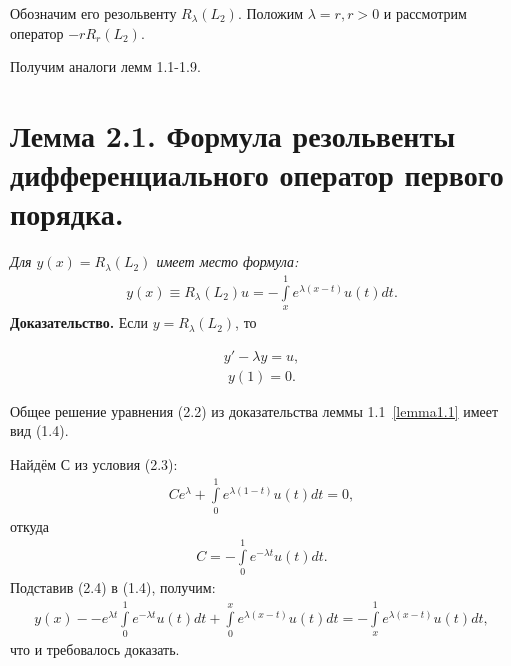 Обозначим его резольвенту $R_\lambda(L_2)$. Положим $ \lambda = r, r > 0 $ и рассмотрим оператор $ -rR_r(L_2) $.

Получим аналоги лемм 1.1-1.9.

\section{Лемма 2.1. Формула резольвенты дифференциального оператор первого порядка.}
\label{lemma2.1} 
\textit{Для $ y(x) = R_\lambda(L_2) $ имеет место формула:}
\begin{equation}
\begin{array}{c}

y(x) \equiv R_\lambda(L_2)u = -\int\limits_x^1 e^{\lambda (x-t)}u(t)dt.

\end{array}
\end{equation}
\textbf{Доказательство.} Если $ y = R_\lambda(L_2) $, то

\begin{equation}
\begin{array}{c}

y' - \lambda y = u,

\end{array}
\end{equation}
\begin{equation}
\begin{array}{c}

y(1) = 0.

\end{array}
\end{equation}

Общее решение уравнения (2.2) из доказательства леммы 1.1~\eqref{lemma1.1} имеет вид (1.4).

Найдём $ С $ из условия (2.3):
\begin{equation}
\begin{array}{c}
\nonumber

Ce^\lambda + \int\limits_0^1 e^{\lambda (1-t)}u(t)dt = 0,

\end{array}
\end{equation}
откуда
\begin{equation}
\begin{array}{c}

C = - \int\limits_0^1 e^{-\lambda t}u(t)dt.

\end{array}
\end{equation}
Подставив (2.4) в (1.4), получим:
\begin{equation}
\begin{array}{c}
\nonumber

y(x) - -e^{\lambda t}\int\limits_0^1 e^{-\lambda t}u(t)dt + \int\limits_0^x e^{\lambda (x-t)}u(t)dt = -\int\limits_x^1 e^{\lambda (x-t)}u(t)dt,

\end{array}
\end{equation}
что и требовалось доказать.

